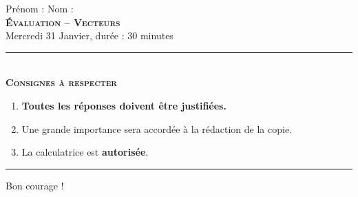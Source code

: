 \documentclass[11pt]{article}
\begin{document}
%
%
%
%
%
%

\begin{center}
  Prénom : \hfill Nom :\hfill~\\[1cm]
\textbf{\LARGE \textsc{Évaluation -- Vecteurs}}\\[2mm]

{\large Mercredi 31 Janvier, durée : 30 minutes}\\[1mm]
\noindent\rule{8cm}{0.4pt}\\[1mm]
\textbf{\textsc{Consignes à respecter}}
\begin{enumerate}[label=\textbf{\arabic*/}]
\item \textbf{Toutes les réponses doivent être justifiées.}
\item Une grande importance sera accordée à la rédaction de la
  copie.
\item La calculatrice est \textbf{autorisée}.
    \end{enumerate}
\noindent\rule{12cm}{0.4pt}
\end{center}

\begin{center}
  Bon courage !
\end{center}
\end{document}
